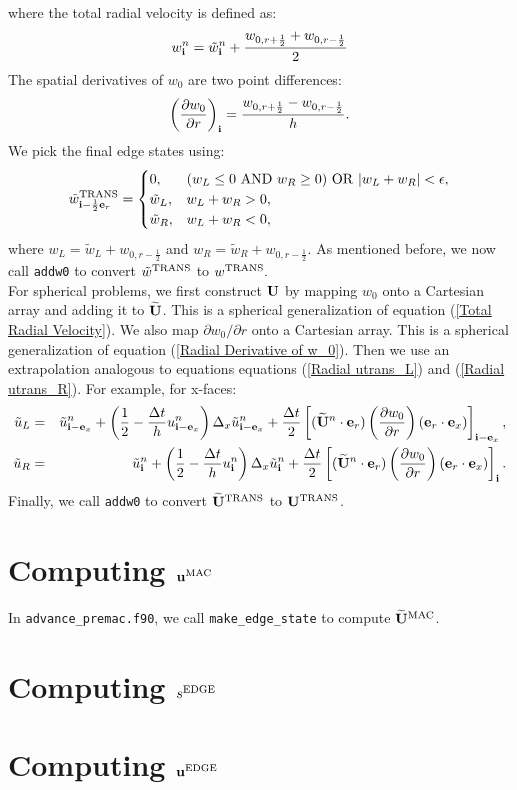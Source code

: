 \documentclass[11pt]{article}
\def\half  {\frac{1}{2}}
\def\dt    {\Delta t}
\def\edge  {\rm EDGE}
\def\mac   {\rm MAC}
\def\trans {\rm TRANS}
\def\eb    {{\bf e}}
\def\ib    {{\bf i}}
\def\ub    {{\bf u}}
\def\Ub    {{\bf U}}
\def\Ubt   {\widetilde{\bf U}}
\def\ut    {\tilde{u}}
\def\wt    {\tilde{w}}
\begin{document}
where the total radial velocity is defined as:
\begin{equation}
w_{\ib}^n = \wt_{\ib}^n + \frac{w_{0,r+\half}+w_{0,r-\half}}{2}\label{Total Radial Velocity}
\end{equation}
The spatial derivatives of $w_0$ are two point differences:
\begin{equation}
\left(\frac{\partial w_0}{\partial r}\right)_{\ib} = \frac{w_{0,r+\half}-w_{0,r-\half}}{h}.\label{Radial Derivative of w_0}
\end{equation}
We pick the final edge states using:
\begin{equation}
\wt^{\trans}_{\ib-\half\eb_r} =
\begin{cases}
0, & (w_L \le 0 ~ {\rm AND} ~ w_R \ge 0) ~ {\rm OR} ~ |w_L + w_R| < \epsilon, \\
\wt_L, & w_L + w_R > 0, \\
\wt_R, & w_L + w_R < 0, \\
\end{cases}
\end{equation}
where $w_L = \wt_L + w_{0,r-\half}$ and $w_R = \wt_R + w_{0,r-\half}$.  As mentioned before, we now call {\tt addw0} to convert $\wt^{\trans}$ to $w^{\trans}.$\\

For spherical problems, we first construct $\Ub$ by mapping $w_0$ onto a Cartesian array and adding it to $\Ubt$.  This is a spherical generalization of equation (\ref{Total Radial Velocity}).  We also map $\partial w_0/\partial r$ onto a Cartesian array.  This is a spherical generalization of equation (\ref{Radial Derivative of w_0}).  Then we use an extrapolation analogous to equations equations (\ref{Radial utrans_L}) and (\ref{Radial utrans_R}).  For example, for x-faces:
\begin{eqnarray}
\ut_L &=& \ut_{\ib-\eb_x}^n + \left(\half - \frac{\dt}{h}u_{\ib-\eb_x}^n\right)\Delta_x\ut_{\ib-\eb_x}^n + \frac{\dt}{2}\left[(\Ubt^n\cdot\eb_r)\left(\frac{\partial w_0}{\partial r}\right)(\eb_r\cdot\eb_x)\right]_{\ib-\eb_x}, \\
\ut_R &=& \ut_{\ib}^n + \left(\half - \frac{\dt}{h}u_{\ib}^n\right)\Delta_x\ut_{\ib}^n + \frac{\dt}{2}\left[(\Ubt^n\cdot\eb_r)\left(\frac{\partial w_0}{\partial r}\right)(\eb_r\cdot\eb_x)\right]_{\ib}.
\end{eqnarray}
Finally, we call {\tt addw0} to convert $\Ubt^{\trans}$ to $\Ub^{\trans}$.
\section{Computing $\ub^{\mac}$}
In {\tt advance\_premac.f90}, we call {\tt make\_edge\_state} to compute $\Ubt^{\mac}$.
\section{Computing $s^{\edge}$}
\section{Computing $\ub^{\edge}$}
\end{document}
